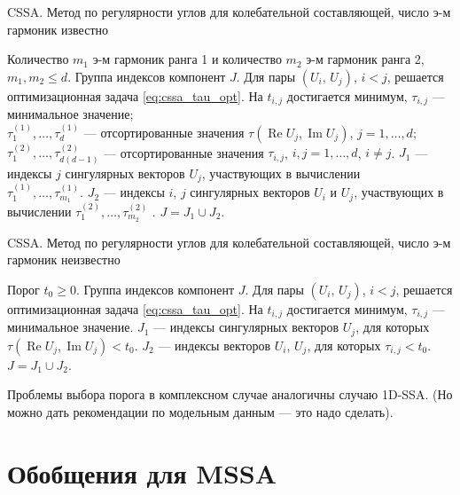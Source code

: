 \documentclass[specialist,
               substylefile = spbu.rtx,
               subf,href,colorlinks=true, 12pt]{disser}
\def\RE{\mathop{\mathrm{Re}}}
\def\IM{\mathop{\mathrm{Im}}}
\begin{document}
\begin{algorithm}[!hhh]
\caption{CSSA. Метод по регулярности углов для колебательной составляющей, число э-м гармоник известно}
\label{alg:cssatau_2}
\begin{algorithmic}[1]
\REQUIRE Количество $m_1$ э-м гармоник ранга 1 и количество $m_2$ э-м гармоник ранга 2,  $m_1, m_2 \leqslant d$.
\ENSURE Группа индексов компонент $J$.
\STATE Для пары $(U_i,\,U_j)$, $i<j$, решается оптимизационная задача \eqref{eq:cssa_tau_opt}.
На $t_{i,j}$ достигается минимум, $\tau_{i,j}$ --- минимальное значение;\\
$\tau_1^{(1)}, \ldots, \tau_d^{(1)}$ --- отсортированные значения $\tau(\RE U_j, \IM U_j)$, $j=1,\ldots, d$;\\
$\tau_1^{(2)}, \ldots, \tau_{d(d-1)}^{(2)}$ --- отсортированные значения $\tau_{i,j}$, $i,j=1,\ldots, d$, $i \not = j$.
\STATE  $J_1$ --- индексы $j$ сингулярных векторов $U_j$, участвующих в вычислении\\ $\tau_1^{(1)}, \ldots, \tau_{m_1}^{(1)}$.
\STATE  $J_2$ --- индексы $i$, $j$ сингулярных векторов $U_i$ и $U_j$, участвующих в вычислении $\tau_1^{(2)}, \ldots, \tau_{m_2}^{(2)}$ .
\STATE $J = J_1 \cup J_2$.
\end{algorithmic}
\end{algorithm}

\begin{algorithm}[!hhh]
\caption{CSSA. Метод по регулярности углов для колебательной составляющей, число э-м гармоник неизвестно}
\label{alg:cssatau}
\begin{algorithmic}[1]
\REQUIRE Порог $t_0 \geqslant 0$.
\ENSURE Группа индексов компонент $J$.
\STATE Для пары $(U_i,\,U_j)$, $i<j$, решается оптимизационная задача \eqref{eq:cssa_tau_opt}.
На $t_{i,j}$ достигается минимум, $\tau_{i,j}$ --- минимальное значение.
\STATE  $J_1$ --- индексы сингулярных векторов $U_j$, для которых $\tau(\RE U_j, \IM U_j) < t_0$.
\STATE  $J_2$ --- индексы векторов  $U_i$, $U_j$, для которых  $\tau_{i,j} < t_0$.
\STATE $J = J_1 \cup J_2$.
\end{algorithmic}
\end{algorithm}

Проблемы выбора порога в комплексном случае аналогичны случаю 1D-SSA.
(Но можно дать рекомендации по модельным данным --- это надо сделать).

\section{Обобщения для MSSA}
\end{document}
